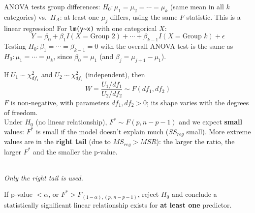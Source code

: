 \begin{remark}
    ANOVA tests group differences: $H_0:\mu_1=\mu_2=\cdots=\mu_k$ (same mean in all $k$
    categories) vs.\ $H_A$: at least one $\mu_j$ differs, using the same $F$ statistic. This is
    a linear regression! For \texttt{lm(y\textasciitilde x)} with one categorical $X$:
    \[Y=\beta_0+\beta_1I(X=\text{Group }2)+\cdots+\beta_{k-1}I(X=\text{Group }k)+\epsilon\]
    Testing $H_0:\beta_1=\cdots=\beta_{k-1}=0$ with the overall ANOVA test is the same as
    $H_0:\mu_1=\cdots=\mu_k$, since $\beta_0=\mu_1$ (and $\beta_j=\mu_{j+1}-\mu_1$).
\end{remark}

\begin{definition}[$F$ Distribution]
    If $U_1\sim\chi^2_{df_1}$ and $U_2\sim\chi^2_{df_2}$ (independent), then
    \[W=\frac{U_1/df_1}{U_2/df_2}\sim F(df_1,df_2)\]
    $F$ is non-negative, with parameters $df_1,df_2>0$; its shape varies with the degrees of freedom.
    \\ Under $H_0$ (no linear relationship), $F^*\sim F(p,n-p-1)$ and we expect \textbf{small}
    values: $F^*$ is small if the model doesn't explain much ($SS_{reg}$ small). More extreme
    values are in the \textbf{right tail} (due to $MS_{reg}>MSR$): the larger the ratio, the larger
    $F^*$ and the smaller the p-value.
\end{definition}

\begin{center}
\\[2pt] \textit{\small Only the right tail is used.}
\end{center}

\begin{definition}
    If p-value $<\alpha$, or $F^*>F_{(1-\alpha),(p,\,n-p-1)}$, reject $H_0$ and conclude a
    statistically significant linear relationship exists for \textbf{at least one} predictor.
\end{definition}

